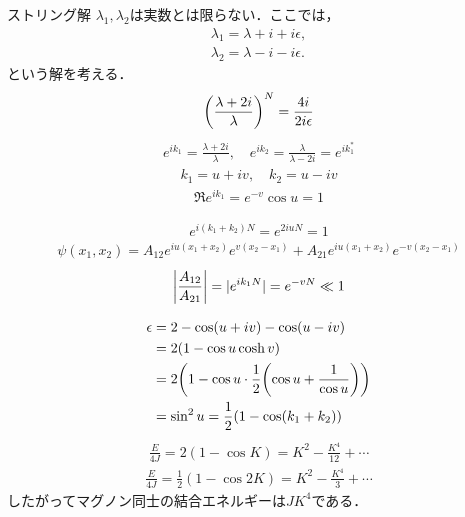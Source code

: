 \documentclass[dvipdfmx,9pt]{beamer}
\numberwithin{equation}{section}
\begin{document}
\begin{frame}{ストリング解}
    $\lambda_1, \lambda_2$は実数とは限らない．ここでは，
    \begin{align}
        \lambda_1 = \lambda + i + i\epsilon,
        \\
        \lambda_2 = \lambda - i - i\epsilon.
    \end{align}
    という解を考える．
    \begin{align}
        \qty(\frac{\lambda + 2i}{\lambda})^N = \frac{4i}{2i\epsilon}
    \end{align}
    \begin{align}
        e^{ik_1} = \frac{\lambda + 2i}{\lambda},
        \quad
        e^{ik_2} = \frac{\lambda}{\lambda - 2i} = e^{ik_1^*}
    \end{align}
    \begin{align}
        k_1 = u+iv,\quad k_2 = u-iv
    \end{align}
    \begin{align}
        \Re e^{ik_1} = e^{-v}\cos u = 1
    \end{align}
\end{frame}

\begin{frame}{}
    \begin{align}
        e^{i(k_1+k_2)N} = e^{2iuN} = 1
    \end{align}
    \begin{align}
        \psi(x_1, x_2) = A_{12}e^{iu(x_1+x_2)}e^{v(x_2-x_1)} + A_{21}e^{iu(x_1+x_2)}e^{-v(x_2-x_1)}
    \end{align}
    \begin{align}
        \qty|\frac{A_{12}}{A_{21}}| = |e^{ik_1 N}| = e^{-vN} \ll 1
    \end{align}
\end{frame}
\begin{frame}
    \begin{align}
        \epsilon &= 2 - \cos(u+iv)-\cos(u-iv) 
        \\ &
        = 2(1-\cos u \cosh v)
        \\ &
        = 2\qty(1- \cos u \cdot \frac{1}{2}\qty(\cos u + \frac{1}{\cos u}))
        \\ &
        = \sin^2 u
        = \frac{1}{2}(1-\cos (k_1+k_2))
    \end{align}
    \begin{align}
        \frac{E}{4J} = 2(1- \cos K) = K^2 - \frac{K^4}{12} + \cdots
    \end{align}
    \begin{align}
        \frac{E}{4J} = \frac{1}{2}(1-\cos 2K) = K^2 - \frac{K^4}{3} + \cdots
    \end{align}
    したがってマグノン同士の結合エネルギーは$JK^4$である．
\end{frame}
\end{document}
